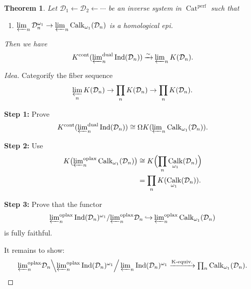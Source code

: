 \documentclass[draft]{amsart}
\newcommand{\cat}[1]{\mathcal{#1}}
\newcommand{\from}{\leftarrow}
\newcommand{\isoto}{\mathbin{\xrightarrow{\sim}}}
\newcommand{\injto}{\mathbin{\hookrightarrow}}
\DeclareMathOperator{\Ind}{Ind}
\DeclareMathOperator{\Cat}{Cat}
\DeclareMathOperator{\Calk}{Calk}
\newtheorem{thm}{Theorem}[section]
\theoremstyle{definition}
\begin{document}
\begin{thm}
Let $\cat D_1 \from \cat D_2 \from \dotsb$ be an inverse system in $\Cat^{\mathrm{perf}}$ such that
\begin{enumerate}[($*$)]
\item $\varprojlim_n \cat D_n^{\omega_1} \to \varprojlim_n \Calk_{\omega_1}(\cat D_n)$ is a homological epi.
\end{enumerate}
Then we have 
\[
K^{\mathrm{cont}}(\textstyle{\varprojlim_n^{\mathrm{dual}}} \Ind(\cat D_n))
\isoto \varprojlim_n K(\cat D_n).
\]
\end{thm}
\begin{proof}[Idea]
Categorify the fiber sequence 
\[
\varprojlim_n K(\cat D_n) \to \prod_n K(\cat D_n) \to \prod_n K(\cat D_n).
\]

\textbf{Step 1:} Prove
\[
K^{\mathrm{cont}}(\textstyle{\varprojlim_n^{\mathrm{dual}}} \Ind(\cat D_n)) \cong \Omega K(\varprojlim_n \Calk_{\omega_1}(\cat D_n)).
\]

\textbf{Step 2:} Use
\begin{align*}
K\bigl(\textstyle{\varprojlim_n^{\mathrm{oplax}}} \Calk_{\omega_1}(\cat D_n)\bigr) &\cong K\Bigl(\prod_n \Calk_{\omega_1}(\cat D_n)\Bigr) \\
&= \prod_n K(\Calk_{\omega_1}(\cat D_n)).
\end{align*}

\textbf{Step 3:} Prove that the functor
\[
\textstyle{\varprojlim_n^{\mathrm{oplax}}} \Ind(\cat D_n)^{\omega_1}/\textstyle{\varprojlim_n^{\mathrm{oplax}}} \cat D_n \injto \textstyle{\varprojlim_n^{\mathrm{oplax}}} \Calk_{\omega_1}(\cat D_n)
\]
is fully faithful.

It remains to show:
\[
\textstyle{\varprojlim_n^{\mathrm{oplax}}} \cat D_n \Big\backslash \textstyle{\varprojlim_n^{\mathrm{oplax}}} \Ind(\cat D_n)^{\omega_1} \Big/ \varprojlim_n \Ind(\cat D_n)^{\omega_1} \xrightarrow{\textnormal{K-equiv.}} \prod_n \Calk_{\omega_1}(\cat D_n).
\]
\end{proof}
\end{document}
